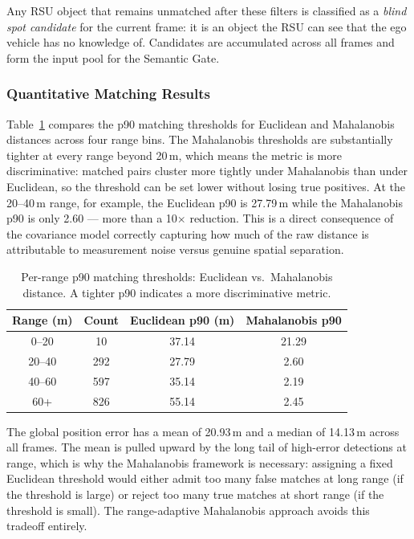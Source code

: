 \documentclass[12pt]{article}
\begin{document}
\medskip
Any RSU object that remains unmatched after these filters is classified
as a \emph{blind spot candidate} for the current frame: it is an object
the RSU can see that the ego vehicle has no knowledge of. Candidates are
accumulated across all frames and form the input pool for the Semantic
Gate.
 
\subsubsection*{Quantitative Matching Results}
 
Table~\ref{tab:mahal_vs_euclid} compares the p90 matching thresholds
for Euclidean and Mahalanobis distances across four range bins. The
Mahalanobis thresholds are substantially tighter at every range beyond
20\,m, which means the metric is more discriminative: matched pairs
cluster more tightly under Mahalanobis than under Euclidean, so the
threshold can be set lower without losing true positives. At the
20--40\,m range, for example, the Euclidean p90 is 27.79\,m while
the Mahalanobis p90 is only 2.60 --- more than a 10$\times$ reduction.
This is a direct consequence of the covariance model correctly capturing
how much of the raw distance is attributable to measurement noise versus
genuine spatial separation.
 
\begin{table}[htbp]
\centering
\caption{Per-range p90 matching thresholds: Euclidean vs.\ Mahalanobis
distance. A tighter p90 indicates a more discriminative metric.}
\label{tab:mahal_vs_euclid}
\begin{tabular}{cccc}
\toprule
\textbf{Range (m)} & \textbf{Count} &
\textbf{Euclidean p90 (m)} & \textbf{Mahalanobis p90} \\
\midrule
0--20  &  10 & 37.14 & 21.29 \\
20--40 & 292 & 27.79 &  2.60 \\
40--60 & 597 & 35.14 &  2.19 \\
60+    & 826 & 55.14 &  2.45 \\
\bottomrule
\end{tabular}
\end{table}
 
\noindent The global position error has a mean of 20.93\,m and a median
of 14.13\,m across all frames. The mean is pulled upward by the long
tail of high-error detections at range, which is why the Mahalanobis
framework is necessary: assigning a fixed Euclidean threshold would
either admit too many false matches at long range (if the threshold is
large) or reject too many true matches at short range (if the threshold
is small). The range-adaptive Mahalanobis approach avoids this tradeoff
entirely.
 
\end{document}
